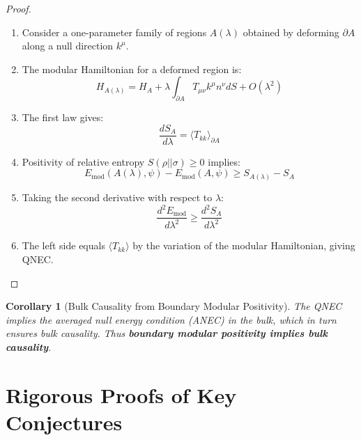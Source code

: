 \documentclass[12pt,a4paper]{article}
\newtheorem{corollary}[theorem]{Corollary}
\begin{document}
\begin{proof}
\begin{enumerate}
    \item Consider a one-parameter family of regions $A(\lambda)$ obtained by deforming $\partial A$ along a null direction $k^\mu$.
    
    \item The modular Hamiltonian for a deformed region is:
    \begin{equation}
    H_{A(\lambda)} = H_A + \lambda \int_{\partial A} T_{\mu\nu} k^\mu n^\nu dS + O(\lambda^2)
    \end{equation}
    
    \item The first law gives:
    \begin{equation}
    \frac{dS_A}{d\lambda} = \langle T_{kk} \rangle_{\partial A}
    \end{equation}
    
    \item Positivity of relative entropy $S(\rho || \sigma) \geq 0$ implies:
    \begin{equation}
    E_{\text{mod}}(A(\lambda), \psi) - E_{\text{mod}}(A, \psi) \geq S_{A(\lambda)} - S_A
    \end{equation}
    
    \item Taking the second derivative with respect to $\lambda$:
    \begin{equation}
    \frac{d^2 E_{\text{mod}}}{d\lambda^2} \geq \frac{d^2 S_A}{d\lambda^2}
    \end{equation}
    
    \item The left side equals $\langle T_{kk} \rangle$ by the variation of the modular Hamiltonian, giving QNEC.
\end{enumerate}
\end{proof}

\begin{corollary}[Bulk Causality from Boundary Modular Positivity]
The QNEC implies the averaged null energy condition (ANEC) in the bulk, which in turn ensures bulk causality. Thus \textbf{boundary modular positivity implies bulk causality}.
\end{corollary}

\section{Rigorous Proofs of Key Conjectures}
\end{document}
